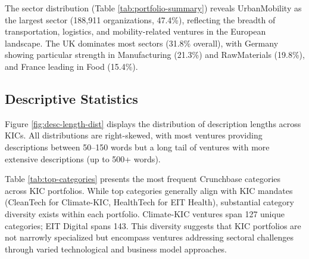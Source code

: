 \documentclass[../main.tex]{subfiles}
\begin{document}
The sector distribution (Table \ref{tab:portfolio-summary}) reveals UrbanMobility as the largest sector (188,911 organizations, 47.4\%), reflecting the breadth of transportation, logistics, and mobility-related ventures in the European landscape. The UK dominates most sectors (31.8\% overall), with Germany showing particular strength in Manufacturing (21.3\%) and RawMaterials (19.8\%), and France leading in Food (15.4\%).

\subsection{Descriptive Statistics}

Figure \ref{fig:desc-length-dist} displays the distribution of description lengths across KICs. All distributions are right-skewed, with most ventures providing descriptions between 50--150 words but a long tail of ventures with more extensive descriptions (up to 500+ words).

\begin{center}
\end{center}

Table \ref{tab:top-categories} presents the most frequent Crunchbase categories across KIC portfolios. While top categories generally align with KIC mandates (CleanTech for Climate-KIC, HealthTech for EIT Health), substantial category diversity exists within each portfolio. Climate-KIC ventures span 127 unique categories; EIT Digital spans 143. This diversity suggests that KIC portfolios are not narrowly specialized but encompass ventures addressing sectoral challenges through varied technological and business model approaches.
\end{document}
